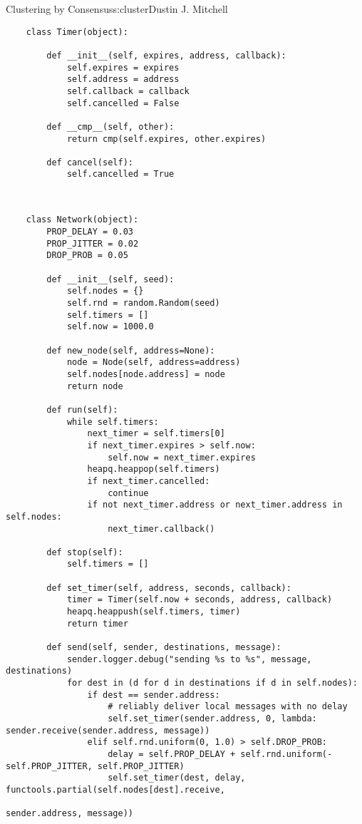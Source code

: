 \begin{aosachapter}{Clustering by Consensus}{s:cluster}{Dustin J. Mitchell}
\begin{verbatim}
    class Timer(object):
    
        def __init__(self, expires, address, callback):
            self.expires = expires
            self.address = address
            self.callback = callback
            self.cancelled = False
    
        def __cmp__(self, other):
            return cmp(self.expires, other.expires)
    
        def cancel(self):
            self.cancelled = True
    
\end{verbatim}

\begin{verbatim}

    class Network(object):
        PROP_DELAY = 0.03
        PROP_JITTER = 0.02
        DROP_PROB = 0.05
    
        def __init__(self, seed):
            self.nodes = {}
            self.rnd = random.Random(seed)
            self.timers = []
            self.now = 1000.0
    
        def new_node(self, address=None):
            node = Node(self, address=address)
            self.nodes[node.address] = node
            return node
    
        def run(self):
            while self.timers:
                next_timer = self.timers[0]
                if next_timer.expires > self.now:
                    self.now = next_timer.expires
                heapq.heappop(self.timers)
                if next_timer.cancelled:
                    continue
                if not next_timer.address or next_timer.address in self.nodes:
                    next_timer.callback()
    
        def stop(self):
            self.timers = []
    
        def set_timer(self, address, seconds, callback):
            timer = Timer(self.now + seconds, address, callback)
            heapq.heappush(self.timers, timer)
            return timer
    
        def send(self, sender, destinations, message):
            sender.logger.debug("sending %s to %s", message, destinations)
            for dest in (d for d in destinations if d in self.nodes):
                if dest == sender.address:
                    # reliably deliver local messages with no delay
                    self.set_timer(sender.address, 0, lambda: sender.receive(sender.address, message))
                elif self.rnd.uniform(0, 1.0) > self.DROP_PROB:
                    delay = self.PROP_DELAY + self.rnd.uniform(-self.PROP_JITTER, self.PROP_JITTER)
                    self.set_timer(dest, delay, functools.partial(self.nodes[dest].receive,
                                                                  sender.address, message))
    

\end{verbatim}
\end{aosachapter}
